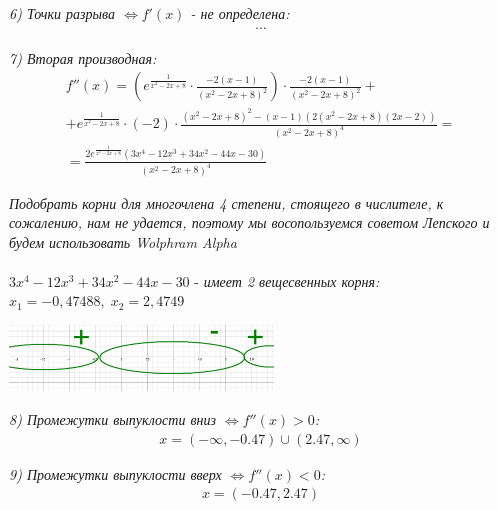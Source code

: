 \documentclass[a4paper,11pt]{article}
\begin{document}
\noindent \textsl{6) Точки разрыва $ \Longleftrightarrow f'(x) $  - не определена:}
\begin{align*}
\cdots
\end{align*}

\noindent \textsl{7) Вторая производная:}
\begin{gather*}	
f''(x) = (e^{\frac{1}{x^2 - 2x + 8}} \cdot \frac{-2(x - 1)}{(x^2 - 2x + 8)^2}) \cdot  \frac{-2(x - 1)}{(x^2 - 2x + 8)^2} + \\
+ e^{\frac{1}{x^2 - 2x + 8}}\cdot(-2)\cdot\frac{(x^2 - 2x + 8)^2 - (x - 1)(2(x^2 - 2x + 8)(2x - 2))}{(x^2 - 2x + 8)^4} = \\
= \frac{2e^{\frac{1}{x^2 - 2x + 8}}(3x^4 - 12x^3 + 34x^2 - 44x - 30)}{(x^2 - 2x + 8)^4}
\end{gather*}

\textit{\footnotesize Подобрать корни для многочлена 4 степени, стоящего в числителе, к сожалению, нам не удается, поэтому мы восопользуемся советом Лепского и будем использовать Wolphram Alpha } \\[4pt] \\
$ 3x^4 - 12x^3 + 34x^2 - 44x - 30 $ - \textit{имеет 2 вещесвенных корня: $ x_1 = -0,47488, \; x_2 = 2,4749 $}

\begin{center}
	\includegraphics[width = 70mm]{images/733.png}
\end{center}
\noindent \textsl{8) Промежутки  выпуклости вниз $\Longleftrightarrow f''(x) > 0 $:}
\begin{gather*}
x = (-\infty, -0.47) \cup (2.47, \infty)
\end{gather*}

\noindent \textsl{9) Промежутки  выпуклости вверх $\Longleftrightarrow f''(x) < 0 $:}
\begin{gather*}
x = (-0.47, 2.47)
\end{gather*}
\end{document}
